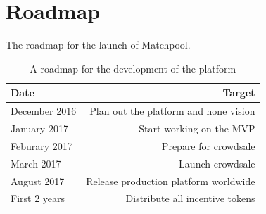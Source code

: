 \documentclass[a4paper]{article}
\begin{document}
\section{Roadmap}
The roadmap for the launch of Matchpool.

\begin{table}[!h]
\centering
\begin{tabular}{l|r}
Date & Target \\\hline
December 2016 & Plan out the platform and hone vision \\
January 2017 & Start working on the MVP \\
Feburary 2017 & Prepare for crowdsale \\
March 2017 & Launch crowdsale \\
August 2017 & Release production platform worldwide \\
First 2 years & Distribute all incentive tokens
\end{tabular}
\caption{\label{tab:widgets}A roadmap for the development of the platform }
\end{table}
\end{document}
